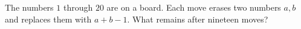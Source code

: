 The numbers $1$ through $20$ are on a board. Each move erases two numbers $a,b$ and replaces them with $a+b-1$. What remains after nineteen moves?
